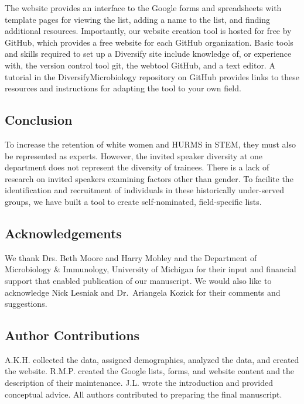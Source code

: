 \documentclass[10pt,]{article}
\begin{document}
The website provides an interface to the Google forms and spreadsheets
with template pages for viewing the list, adding a name to the list, and
finding additional resources. Importantly, our website creation tool is
hosted for free by GitHub, which provides a free website for each GitHub
organization. Basic tools and skills required to set up a Diversify site
include knowledge of, or experience with, the version control tool git,
the webtool GitHub, and a text editor. A tutorial in the
DiversifyMicrobiology repository on GitHub provides links to these
resources and instructions for adapting the tool to your own field.

\subsection{Conclusion}\label{conclusion}

To increase the retention of white women and HURMS in STEM, they must
also be represented as experts. However, the invited speaker diversity
at one department does not represent the diversity of trainees. There is
a lack of research on invited speakers examining factors other than
gender. To facilite the identification and recruitment of individuals in
these historically under-served groups, we have built a tool to create
self-nominated, field-specific lists.

\subsection{Acknowledgements}\label{acknowledgements}

We thank Drs. Beth Moore and Harry Mobley and the Department of
Microbiology \& Immunology, University of Michigan for their input and
financial support that enabled publication of our manuscript. We would
also like to acknowledge Nick Lesniak and Dr.~Ariangela Kozick for their
comments and suggestions.

\subsection{Author Contributions}\label{author-contributions}

A.K.H. collected the data, assigned demographics, analyzed the data, and
created the website. R.M.P. created the Google lists, forms, and website
content and the description of their maintenance. J.L. wrote the
introduction and provided conceptual advice. All authors contributed to
preparing the final manuscript.
\end{document}
